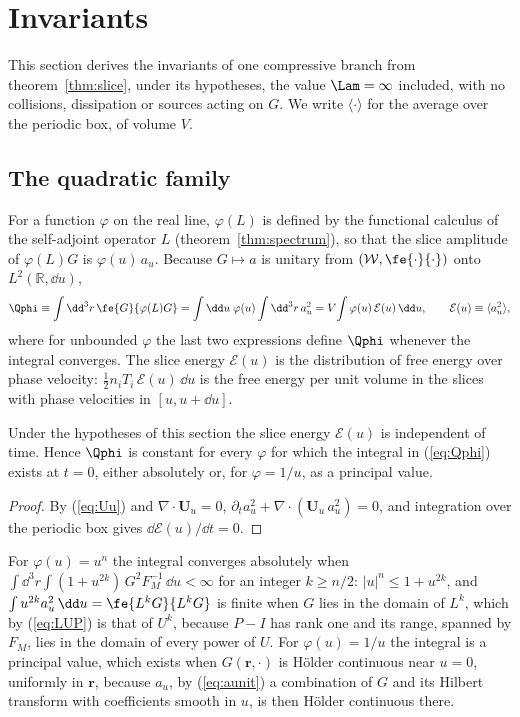 \section{Invariants}\label{sec:invariants}

This section derives the invariants of one compressive branch from theorem~\ref{thm:slice}, under its hypotheses, the value $\Lam=\infty$ included, with no collisions, dissipation or sources acting on $G$. We write $\langle\cdot\rangle$ for the average over the periodic box, of volume $V$.

\subsection{The quadratic family}\label{inv:family}

For a function $\varphi$ on the real line, $\varphi(L)$ is defined by the functional calculus of the self-adjoint operator $L$ (theorem~\ref{thm:spectrum}), so that the slice amplitude of $\varphi(L)G$ is $\varphi(u)\,a_u$. Because $G\mapsto a$ is unitary from $(\mathcal W,\fe{\cdot}{\cdot})$ onto $L^2(\mathbb R,\dd u)$,
\begin{equation}\label{eq:Qphi}
  \Qphi\equiv\int\dd^3r\,\fe{G}{\varphi(L)G}=\int\dd u\;\varphi(u)\int\dd^3r\,a_u^2=V\!\int\varphi(u)\,\mathcal E(u)\,\dd u,
  \qquad \mathcal E(u)\equiv\langle a_u^2\rangle ,
\end{equation}
where for unbounded $\varphi$ the last two expressions define $\Qphi$ whenever the integral converges. The slice energy $\mathcal E(u)$ is the distribution of free energy over phase velocity: $\tfrac12n_iT_i\,\mathcal E(u)\,\dd u$ is the free energy per unit volume in the slices with phase velocities in $[u,u+\dd u]$.

\begin{proposition}\label{inv:energy}
Under the hypotheses of this section the slice energy $\mathcal E(u)$ is independent of time. Hence $\Qphi$ is constant for every $\varphi$ for which the integral in (\ref{eq:Qphi}) exists at $t=0$, either absolutely or, for $\varphi=1/u$, as a principal value.
\end{proposition}

\begin{proof}
By (\ref{eq:Uu}) and $\nabla\cdot\boldsymbol U_u=0$, $\partial_ta_u^2+\nabla\cdot(\boldsymbol U_u\,a_u^2)=0$, and integration over the periodic box gives $\dd\mathcal E(u)/\dd t=0$.
\end{proof}

For $\varphi(u)=u^n$ the integral converges absolutely when $\int\dd^3r\int(1+u^{2k})\,G^2F_M^{-1}\,\dd u<\infty$ for an integer $k\ge n/2$: $|u|^n\le1+u^{2k}$, and $\int u^{2k}a_u^2\,\dd u=\fe{L^kG}{L^kG}$ is finite when $G$ lies in the domain of $L^k$, which by (\ref{eq:LUP}) is that of $U^k$, because $P-I$ has rank one and its range, spanned by $F_M$, lies in the domain of every power of $U$. For $\varphi(u)=1/u$ the integral is a principal value, which exists when $G(\boldsymbol r,\cdot)$ is H\"older continuous near $u=0$, uniformly in $\boldsymbol r$, because $a_u$, by (\ref{eq:aunit}) a combination of $G$ and its Hilbert transform with coefficients smooth in $u$, is then H\"older continuous there.

